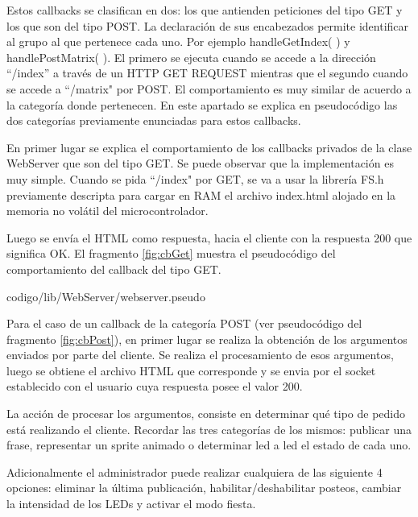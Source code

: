         Estos callbacks se clasifican en dos: los que antienden peticiones del tipo GET y los que son del tipo POST. La declaración de sus encabezados permite identificar al grupo al que pertenece cada uno. Por ejemplo handleGetIndex( ) y handlePostMatrix( ). El primero se ejecuta cuando se accede a la dirección ``/index'' a través de un HTTP GET REQUEST mientras que el segundo cuando se accede a ``/matrix" por POST. El comportamiento es muy similar de acuerdo a la categoría donde pertenecen. En este apartado se explica en pseudocódigo las dos categorías previamente enunciadas para estos callbacks.
    
        En primer lugar se explica el comportamiento de los callbacks privados de la clase WebServer que son del tipo GET. Se puede observar que la implementación es muy simple. Cuando se pida ``/index" por GET, se va a usar la librería FS.h previamente descripta para cargar en RAM el archivo index.html alojado en la memoria no volátil del microcontrolador.
    
        Luego se envía el HTML como respuesta, hacia el cliente con la respuesta 200 que significa OK. El fragmento \ref{fig:cbGet} muestra el pseudocódigo del comportamiento del callback del tipo GET.
    
        
                         {codigo/lib/WebServer/webserver.pseudo}
    
        Para el caso de un callback de la categoría POST (ver pseudocódigo del fragmento \ref{fig:cbPost}), en primer lugar se realiza la obtención de los argumentos enviados por parte del cliente. Se realiza el procesamiento de esos argumentos, luego se obtiene el archivo HTML que corresponde y se envia por el socket establecido con el usuario cuya respuesta posee el valor 200.
    
        La acción de procesar los argumentos, consiste en determinar qué tipo de pedido está realizando el cliente. Recordar las tres categorías de los mismos: publicar una frase, representar un sprite animado o determinar led a led el estado de cada uno. 
        
        Adicionalmente el administrador puede realizar cualquiera de las siguiente 4 opciones: eliminar la última publicación, habilitar/deshabilitar posteos, cambiar la intensidad de los LEDs y activar el modo fiesta.
        
